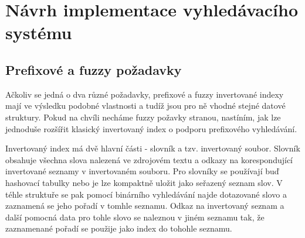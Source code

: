 \documentclass[11pt]{article}
\begin{document}
\section{Návrh implementace vyhledávacího systému}
\subsection{Prefixové a fuzzy požadavky}
Ačkoliv se jedná o dva různé požadavky, prefixové a fuzzy invertované indexy
mají ve výsledku podobné vlastnosti a tudíž jsou pro ně vhodné stejné datové
struktury. Pokud na chvíli necháme fuzzy požavky stranou, nastíním, jak lze
jednoduše rozšířit klasický invertovaný index o podporu prefixového
vyhledávání.

Invertovaný index má dvě hlavní části - slovník a tzv. invertovaný soubor.
Slovník obsahuje všechna slova nalezená ve zdrojovém textu a odkazy na
korespondující invertované seznamy v invertovaném souboru. Pro slovníky se
používají buď hashovací tabulky nebo je lze kompaktně uložit jako seřazený
seznam slov. V téhle struktuře se pak pomocí binárního vyhledávání najde
dotazované slovo a zaznamená se jeho pořadí v tomhle seznamu. Odkaz na
invertovaný seznam a další pomocná data pro tohle slovo se naleznou v jiném
seznamu tak, že zaznamenané pořadí se použije jako index do tohohle seznamu.

%
\end{document}
